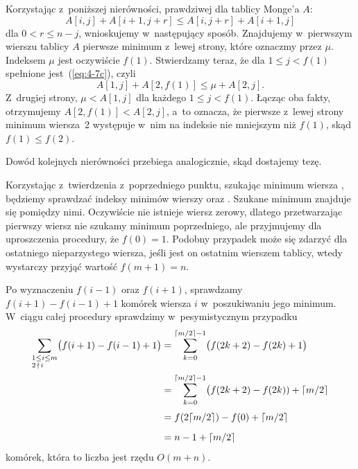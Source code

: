 \subproblem %
Korzystając z~poniższej nierówności, prawdziwej dla tablicy Monge'a $A$:
\[
	A[i,j]+A[i+1,j+r] \le A[i,j+r]+A[i+1,j] \tag{$*$}\label{eq:4-7c}
\]
dla $0<r\le n-j$, wnioskujemy w~następujący sposób. Znajdujemy w~pierwszym wierszu tablicy $A$ pierwsze minimum z~lewej strony, które oznaczmy przez $\mu$. Indeksem $\mu$ jest oczywiście $f(1)$. Stwierdzamy teraz, że dla $1\le j<f(1)$ spełnione jest~(\ref{eq:4-7c}), czyli
\[
    A[1,j]+A[2,f(1)] \le \mu+A[2,j].
\]
Z~drugiej strony, $\mu<A[1,j]$ dla każdego $1\le j<f(1)$. Łącząc oba fakty, otrzymujemy $A[2,f(1)]<A[2,j]$, a~to oznacza, że pierwsze z~lewej strony minimum wiersza~2 występuje w~nim na indeksie nie mniejszym niż $f(1)$, skąd $f(1)\le f(2)$.

Dowód kolejnych nierówności przebiega analogicznie, skąd dostajemy tezę.

\subproblem %
Korzystając z~twierdzenia z~poprzedniego punktu, szukając minimum wiersza , będziemy sprawdzać indeksy minimów wierszy  oraz . Szukane minimum znajduje się pomiędzy nimi. Oczywiście nie istnieje wiersz zerowy, dlatego przetwarzając pierwszy wiersz nie szukamy minimum poprzedniego, ale przyjmujemy dla uproszczenia procedury, że $f(0)=1$. Podobny przypadek może się zdarzyć dla ostatniego nieparzystego wiersza, jeśli jest on ostatnim wierszem tablicy, wtedy wystarczy przyjąć wartość $f(m+1)=n$.

Po wyznaczeniu $f(i-1)$ oraz $f(i+1)$, sprawdzamy $f(i+1)-f(i-1)+1$ komórek wiersza $i$ w~poszukiwaniu jego minimum. W~ciągu całej procedury sprawdzimy w~pesymistycznym przypadku
\begin{align*}
	\sum_{\begin{subarray}{l}1\le i\le m\\2\,\nmid\,i\end{subarray}}\bigl(f(i+1)-f(i-1)+1\bigr) &= \sum_{k=0}^{\lceil m/2\rceil-1}\bigl(f(2k+2)-f(2k)+1\bigr) \\
	&= \sum_{k=0}^{\lceil m/2\rceil-1}\bigl(f(2k+2)-f(2k))+\lceil m/2\rceil \\[1mm]
	&= f(2\lceil m/2\rceil)-f(0)+\lceil m/2\rceil \\[2mm]
	&= n-1+\lceil m/2\rceil
\end{align*}
komórek, która to liczba jest rzędu $O(m+n)$.

